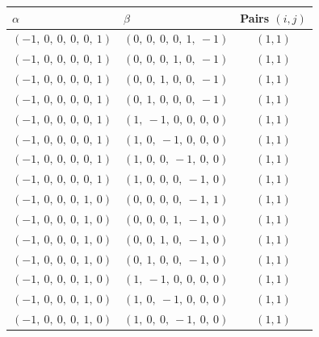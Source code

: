 \documentclass[11pt]{article}
\newcommand{\noi}{\noindent}
\theoremstyle{definition}
\begin{document}
\noi \noindent \begin{longtable}{|l|l|c|}
    \hline
    $\alpha$ & $\beta$ & Pairs $(i,j)$ \\
    \hline
    \endhead
    $\left( -1, \  0, \  0, \  0, \  0, \  1\right)$ & $\left( 0, \  0, \  0, \  0, \  1, \  -1\right)$ & $(1,1)$ \\
    \hline
    $\left( -1, \  0, \  0, \  0, \  0, \  1\right)$ & $\left( 0, \  0, \  0, \  1, \  0, \  -1\right)$ & $(1,1)$ \\
    \hline
    $\left( -1, \  0, \  0, \  0, \  0, \  1\right)$ & $\left( 0, \  0, \  1, \  0, \  0, \  -1\right)$ & $(1,1)$ \\
    \hline
    $\left( -1, \  0, \  0, \  0, \  0, \  1\right)$ & $\left( 0, \  1, \  0, \  0, \  0, \  -1\right)$ & $(1,1)$ \\
    \hline
    $\left( -1, \  0, \  0, \  0, \  0, \  1\right)$ & $\left( 1, \  -1, \  0, \  0, \  0, \  0\right)$ & $(1,1)$ \\
    \hline
    $\left( -1, \  0, \  0, \  0, \  0, \  1\right)$ & $\left( 1, \  0, \  -1, \  0, \  0, \  0\right)$ & $(1,1)$ \\
    \hline
    $\left( -1, \  0, \  0, \  0, \  0, \  1\right)$ & $\left( 1, \  0, \  0, \  -1, \  0, \  0\right)$ & $(1,1)$ \\
    \hline
    $\left( -1, \  0, \  0, \  0, \  0, \  1\right)$ & $\left( 1, \  0, \  0, \  0, \  -1, \  0\right)$ & $(1,1)$ \\
    \hline
    $\left( -1, \  0, \  0, \  0, \  1, \  0\right)$ & $\left( 0, \  0, \  0, \  0, \  -1, \  1\right)$ & $(1,1)$ \\
    \hline
    $\left( -1, \  0, \  0, \  0, \  1, \  0\right)$ & $\left( 0, \  0, \  0, \  1, \  -1, \  0\right)$ & $(1,1)$ \\
    \hline
    $\left( -1, \  0, \  0, \  0, \  1, \  0\right)$ & $\left( 0, \  0, \  1, \  0, \  -1, \  0\right)$ & $(1,1)$ \\
    \hline
    $\left( -1, \  0, \  0, \  0, \  1, \  0\right)$ & $\left( 0, \  1, \  0, \  0, \  -1, \  0\right)$ & $(1,1)$ \\
    \hline
    $\left( -1, \  0, \  0, \  0, \  1, \  0\right)$ & $\left( 1, \  -1, \  0, \  0, \  0, \  0\right)$ & $(1,1)$ \\
    \hline
    $\left( -1, \  0, \  0, \  0, \  1, \  0\right)$ & $\left( 1, \  0, \  -1, \  0, \  0, \  0\right)$ & $(1,1)$ \\
    \hline
    $\left( -1, \  0, \  0, \  0, \  1, \  0\right)$ & $\left( 1, \  0, \  0, \  -1, \  0, \  0\right)$ & $(1,1)$ \\

\end{longtable}
\end{document}
